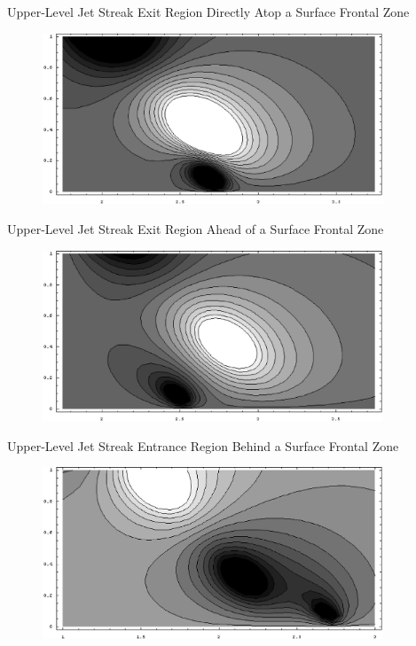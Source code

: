 \documentclass[landscape]{seminar}
\begin{document}
\begin{slide}

\begin{center}
Upper-Level Jet Streak Exit Region Directly Atop a Surface Frontal Zone
\begin{figure}
\includegraphics[width=4in]{img/sg_slope_n16_s05_2src_atop.eps}
\end{figure}
\end{center}

\end{slide}
\begin{slide}

\begin{center}
Upper-Level Jet Streak Exit Region Ahead of a Surface Frontal Zone
\begin{figure}
\includegraphics[width=4in]{img/sg_slope_n16_s05_2src_jetds.eps}
\end{figure}
\end{center}

\end{slide}
\begin{slide}

\begin{center}
Upper-Level Jet Streak Entrance Region Behind a Surface Frontal Zone
\begin{figure}
\includegraphics[width=4in]{img/sg_slope_n16_s05_entrjet.eps}
\end{figure}
\end{center}

\end{slide}
\end{document}
